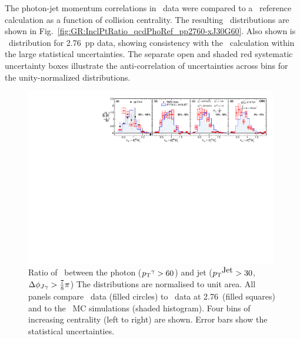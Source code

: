 The photon-jet momentum correlations in \PbPb\ data were compared to a \PYTHYD\ reference
calculation as a function of collision centrality. The resulting
\xjg\ distributions are shown in Fig.~\ref{fig:GR:InclPtRatio_qcdPhoRef_pp2760-xJ30G60}.
Also shown is \avexjg\ distribution for 2.76\TeV\ pp data, showing consistency
with the \PYTHYD\ calculation within the large statistical uncertainties.
The separate open and shaded red systematic uncertainty boxes illustrate the
anti-correlation of uncertainties across bins for the unity-normalized distributions.

\begin{figure}[!ht]
\begin{center}
\includegraphics[width=0.98\textwidth]{jetfigures/Photonv7_Paper_InclPtRatio_all_cent4_G60J30_subDPhi1SS1_Isol0_Norm1log1.pdf}
\caption[]{\label{fig:GR:InclPtRatio_qcdPhoRef_pp2760-xJ30G60} Ratio of \pT\ between the
  photon ($\mbox{$p_{\mathrm{T}}$}^{\gamma} > 60$\GeVc) and jet ($\mbox{$p_{\mathrm{T}}$}^{\mbox{Jet}} > 30$\GeVc, $\Delta\phi_{J\gamma} > \frac{7}{8}\pi$)
  The distributions are normalised to unit area. All panels compare
\PbPb\ data (filled circles) to \pp\ data at
  2.76\TeV\ (filled squares) and to the \PYTHYD\ MC simulations
  (shaded histogram). Four bins of increasing centrality (left to right) are shown.
Error bars show the statistical uncertainties.
}
\label{fig:GR:CMS_xjg}
\end{center}
\end{figure}

